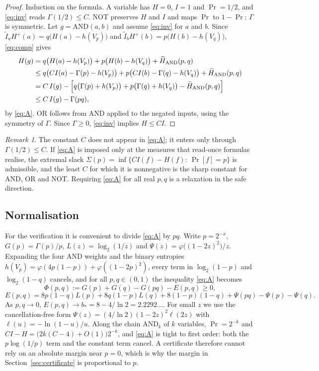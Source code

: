 \documentclass[11pt]{amsart}
\theoremstyle{remark}
\newtheorem{remark}[theorem]{Remark}
\newcommand{\Ht}{\widetilde H}
\newcommand{\It}{\widetilde I}
\renewcommand{\Pr}{\operatorname{Pr}}
\begin{document}
\begin{proof}
Induction on the formula. A variable has $H=0$, $I=1$ and $\Pr=1/2$, and \eqref{eq:inv} reads $\Gamma(1/2)\le C$. NOT preserves $H$ and $I$ and maps $\Pr$ to $1-\Pr$; $\Gamma$ is symmetric. Let $g=\mathrm{AND}(a,b)$ and assume \eqref{eq:inv} for $a$ and $b$. Since $\It_a H^+(a)=q\bigl(H(a)-h(V_p)\bigr)$ and $\It_b H^+(b)=p\bigl(H(b)-h(V_q)\bigr)$, \eqref{eq:comp} gives
\begin{align*}
H(g)&=q\bigl(H(a)-h(V_p)\bigr)+p\bigl(H(b)-h(V_q)\bigr)+\Ht_{\mathrm{AND}}(p,q)\\
&\le q\bigl(C I(a)-\Gamma(p)-h(V_p)\bigr)+p\bigl(C I(b)-\Gamma(q)-h(V_q)\bigr)+\Ht_{\mathrm{AND}}(p,q)\\
&= C\,I(g)-\Bigl[q\bigl(\Gamma(p)+h(V_p)\bigr)+p\bigl(\Gamma(q)+h(V_q)\bigr)-\Ht_{\mathrm{AND}}(p,q)\Bigr]\\
&\le C\,I(g)-\Gamma(pq),
\end{align*}
by \eqref{eq:A}. OR follows from AND applied to the negated inputs, using the symmetry of $\Gamma$. Since $\Gamma\ge0$, \eqref{eq:inv} implies $H\le CI$.
\end{proof}

\begin{remark}
The constant $C$ does not appear in \eqref{eq:A}; it enters only through $\Gamma(1/2)\le C$. If \eqref{eq:A} is imposed only at the measures that read-once formulas realise, the extremal slack $\Sigma(p)=\inf\{C I(f)-H(f):\ \Pr[f]=p\}$ is admissible, and the least $C$ for which it is nonnegative is the sharp constant for AND, OR and NOT. Requiring \eqref{eq:A} for all real $p,q$ is a relaxation in the safe direction.
\end{remark}

\subsection*{Normalisation}
For the verification it is convenient to divide \eqref{eq:A} by $pq$. Write $p=2^{-x}$, $G(p)=\Gamma(p)/p$, $L(z)=\log_2(1/z)$ and $\Psi(z)=\varphi\bigl((1-2z)^2\bigr)/z$. Expanding the four AND weights and the binary entropies $h(V_p)=\varphi(4p(1-p))+\varphi((1-2p)^2)$, every term in $\log_2(1-p)$ and $\log_2(1-q)$ cancels, and for all $p,q\in(0,1)$ the inequality \eqref{eq:A} becomes
\begin{equation}\label{eq:Aprime}
\Phi(p,q):=G(p)+G(q)-G(pq)-E(p,q)\ge0,
\end{equation}
\[
E(p,q)=8p(1-q)L(p)+8q(1-p)L(q)+8(1-p)(1-q)+\Psi(pq)-\Psi(p)-\Psi(q).
\]
As $p,q\to0$, $E(p,q)\to b_*=8-4/\ln 2=2.2292\ldots$. For small $z$ we use the cancellation-free form $\Psi(z)=(4/\ln2)(1-2z)^2\ell(2z)$ with $\ell(u)=-\ln(1-u)/u$. Along the chain $\mathrm{AND}_k$ of $k$ variables, $\Pr=2^{-k}$ and $C I-H=\bigl(2k(C-4)+O(1)\bigr)2^{-k}$, and \eqref{eq:A} is tight to first order: both the $p\log(1/p)$ term and the constant term cancel. A certificate therefore cannot rely on an absolute margin near $p=0$, which is why the margin in Section~\ref{sec:certificate} is proportional to $p$.
\end{document}
